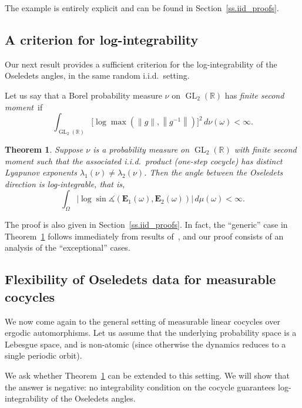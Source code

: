\documentclass[10pt]{amsart}
\newtheorem{theo}{Theorem}[section]
\theoremstyle{definition}\newtheorem{defi}[theo]{Definition}\newtheorem{rema}[theo]{Remark}\newtheorem{exam}[theo]{Example}\newtheorem{exem}[theo]{Example}\newtheorem{nota}[theo]{Notation}
\newcommand{\R}{\mathbb{R}}
\newcommand{\E}{\mathbf{E}}
\DeclareMathOperator{\GL}{GL}
\renewcommand{\angle}{\measuredangle}
\begin{document}
The example is entirely explicit and can be found in Section~\ref{ss.iid_proofs}.

\subsection{A criterion for log-integrability}

Our next result provides a sufficient criterion for the log-integrability of the Oseledets angles, in the same random i.i.d.~setting.

Let us say that a Borel probability measure $\nu$ on $\GL_2(\R)$ has \emph{finite second moment}~if
\begin{equation}
\int_{\GL_2(\R)} \bigl[\log \max \left(\|g\|, \left\|g^{-1}\right\|\right) \bigr]^2 \, d\nu(\omega) < \infty.
\end{equation}


\begin{theo}\label{t.integrable}
Suppose $\nu$ is a probability measure on $\GL_2(\R)$ with finite second moment such that the associated i.i.d.~product (one-step cocycle) has distinct Lyapunov exponents $\lambda_1(\nu) \neq \lambda_2(\nu)$. Then the angle between the Oseledets direction is log-integrable, that is,
\begin{equation}
\int_{\Omega}\left|\log\sin \angle(\E_1(\omega),\E_2(\omega)) \right|\, d\mu(\omega) < \infty.
\end{equation}
\end{theo}


The proof is also given in Section~\ref{ss.iid_proofs}. In fact, the ``generic'' case in Theorem~\ref{t.integrable} follows immediately from results of~\cite{benoist-quint}, and our proof consists of an analysis of the ``exceptional'' cases.


\subsection{Flexibility of Oseledets data for measurable cocycles}

We now come again to the general setting of measurable linear cocycles over ergodic automorphisms. Let us assume that the underlying probability space is a Lebesgue space, and is non-atomic (since otherwise the dynamics reduces to a single periodic orbit).

We ask whether Theorem~\ref{t.integrable} can be extended to this setting. We will show that the answer is negative: no integrability condition on the cocycle guarantees log-integrability of the Oseledets angles.
\end{document}
